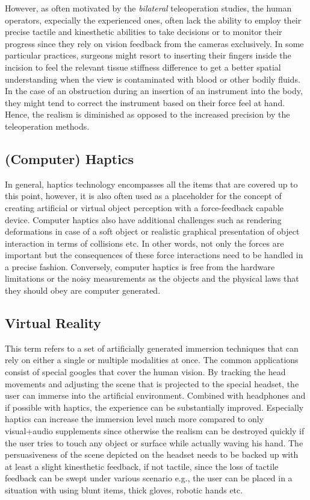 However, as often motivated by the \emph{bilateral} teleoperation studies, the human operators, expecially the experienced ones, often 
lack the ability to employ their precise tactile and kinesthetic abilities to take decisions or to monitor their progress since they rely 
on vision feedback from the cameras exclusively. In some particular practices, surgeons might resort to inserting their fingers inside 
the incision to feel the relevant tissue stiffness difference to get a better spatial understanding when the view is contaminated with 
blood or other bodily fluids. In the case of an obstruction during an insertion of an instrument into the body, they might tend to 
correct the instrument based on their force feel at hand. Hence, the realism is diminished as opposed to the increased precision by the 
teleoperation methods. 

\subsection[Haptics]{(Computer) Haptics}
In general, haptics technology encompasses all the items that are covered up to this point, however, it is also often used as a 
placeholder for the concept of creating artificial or virtual object perception with a force-feedback capable device. Computer haptics 
also have additional challenges such as rendering deformations in case of a soft object or realistic graphical presentation of object 
interaction in terms of collisions etc. In other words, not only the forces are important but the consequences of these force 
interactions need to be handled in a precise fashion. Conversely, computer haptics is free from the hardware limitations or the noisy 
measurements as the objects and the physical laws that they should obey are computer generated. 


\subsection{Virtual Reality}

This term refers to a set of artificially generated immersion techniques that can rely on either a single or multiple modalities at once. 
The common applications consist of special googles that cover the human vision. By tracking the head movements and adjusting the scene 
that is projected to the special headset, the user can immerse into the artificial environment. Combined with headphones and if possible 
with haptics, the experience can be substantially improved. Especially haptics can increase the immersion level much more compared to 
only visual+audio supplements since otherwise the realism can be destroyed quickly if the user tries to touch any object or surface while 
actually waving his hand. The persuasiveness of the scene depicted on the headset needs to be backed up with at least a slight 
kinesthetic feedback, if not tactile, since the loss of tactile feedback can be swept under various scenario e.g., the user can be placed 
in a situation with using blunt items, thick gloves, robotic hands etc. 
